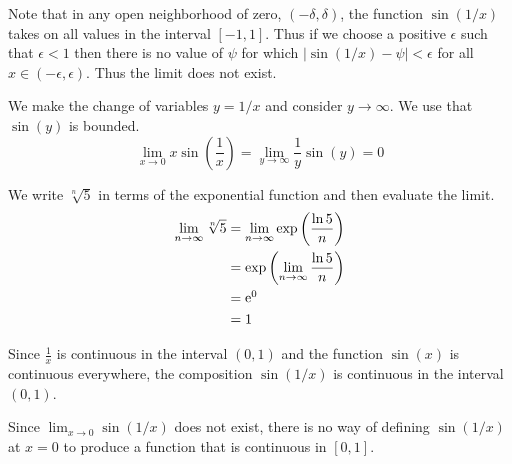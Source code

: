 

\begin{Solution}
  \label{solution lim sin 1/x}
  Note that in any open neighborhood of zero, $(-\delta,\delta)$, the 
  function $\sin(1/x)$ takes on all values in the interval $[-1,1]$.  
  Thus if we choose a positive $\epsilon$ such that $\epsilon < 1$ then there
  is no value of $\psi$ for which $| \sin(1/x) - \psi | < \epsilon$ for all
  $x \in (-\epsilon,\epsilon)$.  Thus the limit does not exist.
\end{Solution}





\begin{Solution}
  \label{solution lim x sin 1/x}
  We make the change of variables $y = 1/x$ and consider $y \to \infty$.  We use that
  $\sin(y)$ is bounded.
  \[
  \lim_{x \to 0} x \sin \left( \frac{1}{x} \right)
  = \lim_{y \to \infty} \frac{1}{y} \sin(y)
  = 0
  \]
\end{Solution}


\begin{Solution}
  \label{solution limit sqrt n 5}
  We write $\sqrt[n]{5}$ in terms of the exponential function and then
  evaluate the limit.
  \begin{align*}
    \lim_{n \to \infty} \sqrt[n]{5}
     &= \lim_{n \to \infty} \exp \left( \frac{\ln 5}{n} \right)
     \\
     &= \exp \left( \lim_{n \to \infty} \frac{\ln 5}{n} \right)
     \\
     &= \mathop{\mathrm{e}}\nolimits^{0}
     \\
     &= 1
  \end{align*}
\end{Solution}







\begin{Solution}
  \label{solution sin 1/x continuous}
  Since $\frac{1}{x}$ is continuous in the interval $(0,1)$ and the function
  $\sin(x)$ is continuous everywhere, the composition $\sin(1/x)$ is 
  continuous in the interval $(0,1)$.

  Since $\lim_{x \to 0} \sin(1/x)$ does not exist, there is no way of defining
  $\sin(1/x)$ at $x = 0$ to produce a function that is continuous in $[0,1]$.
\end{Solution}


